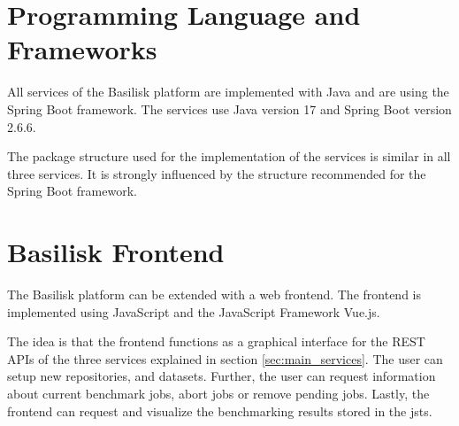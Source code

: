 \section{Programming Language and Frameworks}
\label{sec:prog_lang_and_framework}
All services of the Basilisk platform are implemented with Java and are using the Spring Boot framework.
The services use Java version 17 and Spring Boot version 2.6.6.

The package structure used for the implementation of the services is similar in all three services.
It is strongly influenced by the structure recommended for the Spring Boot framework.






\section{Basilisk Frontend}
\label{sec:basilisk_frontend}
The Basilisk platform can be extended with a web frontend.
The frontend is implemented using JavaScript and the JavaScript Framework Vue.js.

The idea is that the frontend functions as a graphical interface for the REST APIs of the three services explained in  section \ref{sec:main_services}.
The user can setup new repositories, \tsp{} and datasets.
Further, the user can request information about current benchmark jobs, abort jobs or remove pending jobs.
Lastly, the frontend can request and visualize the benchmarking results stored in the \acl{jsts}.







